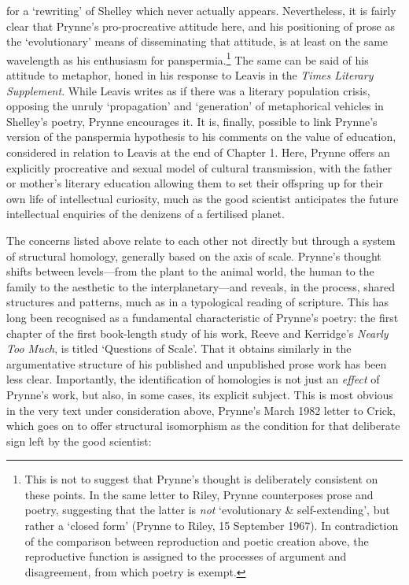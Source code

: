 \documentclass[]{article}
\begin{document}
for a ‘rewriting’ of Shelley which never actually appears. Nevertheless,
it is fairly clear that Prynne’s pro-procreative attitude here, and his
positioning of prose as the ‘evolutionary’ means of disseminating that
attitude, is at least on the same wavelength as his enthusiasm for
panspermia.\footnote{This is not to suggest that Prynne’s thought is
  deliberately consistent on these points. In the same letter to Riley,
  Prynne counterposes prose and poetry, suggesting that the latter is
  \emph{not} ‘evolutionary \& self-extending’, but rather a ‘closed
  form’ (Prynne to Riley, 15 September 1967). In contradiction of the
  comparison between reproduction and poetic creation above, the
  reproductive function is assigned to the processes of argument and
  disagreement, from which poetry is exempt.} The same can be said of
his attitude to metaphor, honed in his response to Leavis in the
\emph{Times Literary Supplement}. While Leavis writes as if there was a
literary population crisis, opposing the unruly ‘propagation’ and
‘generation’ of metaphorical vehicles in Shelley’s poetry, Prynne
encourages it. It is, finally, possible to link Prynne’s version of the
panspermia hypothesis to his comments on the value of education,
considered in relation to Leavis at the end of Chapter 1. Here, Prynne
offers an explicitly procreative and sexual model of cultural
transmission, with the father or mother’s literary education allowing
them to set their offspring up for their own life of intellectual
curiosity, much as the good scientist anticipates the future
intellectual enquiries of the denizens of a fertilised planet.

The concerns listed above relate to each other not directly but through
a system of structural homology, generally based on the axis of scale.
Prynne’s thought shifts between levels—from the plant to the animal
world, the human to the family to the aesthetic to the
interplanetary—and reveals, in the process, shared structures and
patterns, much as in a typological reading of scripture. This has long
been recognised as a fundamental characteristic of Prynne’s poetry: the
first chapter of the first book-length study of his work, Reeve and
Kerridge’s \emph{Nearly Too Much}, is titled ‘Questions of Scale’. That
it obtains similarly in the argumentative structure of his published and
unpublished prose work has been less clear. Importantly, the
identification of homologies is not just an \emph{effect} of Prynne’s
work, but also, in some cases, its explicit subject. This is most
obvious in the very text under consideration above, Prynne’s March 1982
letter to Crick, which goes on to offer structural isomorphism as the
condition for that deliberate sign left by the good scientist:
\end{document}
